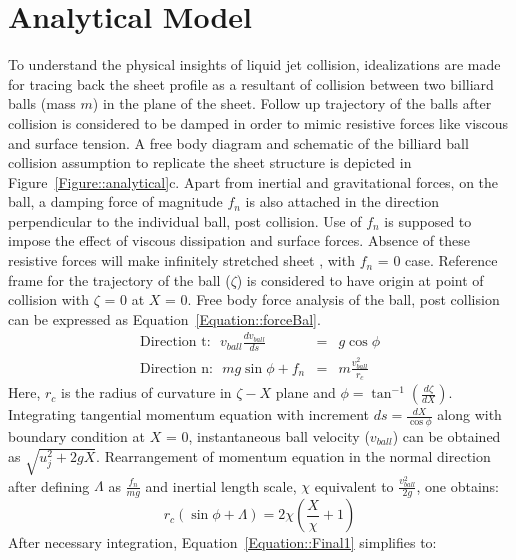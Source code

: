 \documentclass{jfm}
\begin{document}
\section{Analytical Model}	
To understand the physical insights of liquid jet collision, idealizations are made for tracing back the sheet profile as a resultant of collision between two billiard balls (mass $m$) in the plane of the sheet. Follow up trajectory of the balls after collision is considered to be damped in order to mimic resistive forces like viscous and surface tension. A free body diagram and schematic of the billiard ball collision assumption to replicate the sheet structure is depicted in Figure~\ref{Figure::analytical}c. Apart from inertial and gravitational forces, on the ball, a damping force of magnitude $f_n$ is also attached in the direction perpendicular to the individual ball, post collision. Use of $f_n$ is supposed to impose the effect of viscous dissipation and surface forces. Absence of these resistive forces will make infinitely stretched sheet \citep{taylor1960formation}, with $f_n$ = 0 case. Reference frame for the trajectory of the ball ($\zeta$) is considered to have origin at point of collision with $\zeta$ = 0 at $X$ = 0.
Free body force analysis of the ball, post collision can be expressed as Equation~\ref{Equation::forceBal}.
\begin{subequations}
	\label{Equation::forceBal}	
	\begin{eqnarray}
	\label{Equation::tangential(a)}
	\text{Direction t:}\:\:\: v_{ball}\frac{dv_{ball}}{ds} &=& g\cos\phi\\
	\text{Direction n:}\:\:\: mg\sin\phi + f_n &=& m\frac{v_{ball}^2}{r_c}
	\end{eqnarray}
\end{subequations}
Here, $r_c$ is the radius of curvature in $\zeta-X$ plane and $\phi = \tan^{-1}\left(\frac{d\zeta}{dX}\right)$. Integrating tangential momentum equation with increment $ds = \frac{dX}{\cos\phi}$ along with boundary condition at $X$ = 0, instantaneous ball velocity ($v_{ball}$) can be obtained as $\sqrt{u_j^2 + 2gX}$. Rearrangement of momentum equation in the normal direction after defining $\Lambda$ as $\frac{f_n}{mg}$ and inertial length scale, $\chi$ equivalent to $\frac{v_{ball}^2}{2g}$, one obtains:
\begin{equation}\label{Equation::Final1}
r_c\left(\sin\phi + \Lambda\right) = 2\chi\left(\frac{X}{\chi} + 1\right)
\end{equation} 
After necessary integration, Equation~\ref{Equation::Final1} simplifies to:
\end{document}
